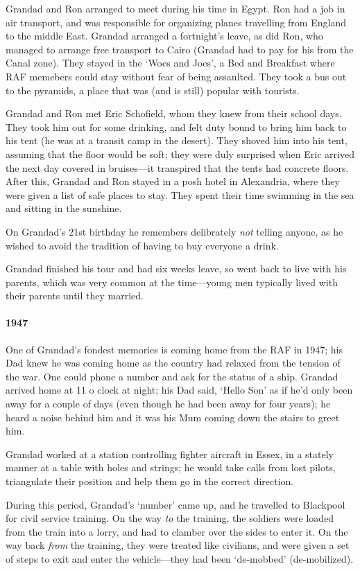 Grandad and Ron arranged to meet during his time in Egypt. Ron had a job
in air transport, and was responsible for organizing planes travelling from England
to the middle East. Grandad arranged a fortnight's leave, as did Ron, who
managed to arrange free transport to Cairo (Grandad had to pay for his from
the Canal zone). They stayed in the `Woes and Joes', a Bed and Breakfast where RAF memebers
could stay without fear of being assaulted. They took a bus out to the pyramids, a place
that was (and is still) popular with tourists.

Grandad and Ron met Eric Schofield, whom they knew from their school days. They
took him out for some drinking, and felt duty bound to bring him back to his tent (he was
at a transit camp in the desert). They shoved him into his tent, assuming that
the floor would be soft; they were duly surprised when Eric arrived the next day
covered in bruises---it transpired that the tents had concrete floors. After this,
Grandad and Ron stayed in a posh hotel in Alexandria, where they were given
a list of safe places to stay. They spent their time swimming in the sea
and sitting in the sunshine.

On Grandad's 21st birthday he remembers delibrately \emph{not} telling anyone, as
he wished to avoid the tradition of having to buy everyone a drink.

Grandad finished his tour and had six weeks leave, so went back to live with his parents, which was
very common at the time---young men typically lived with their parents until they married.

\paragraph{1947} One of Grandad's fondest memories is coming home from the RAF in 1947; his Dad knew
he was coming home  as the country had relaxed from the tension of the war.
One could phone a number and ask for the status of a ship. Grandad arrived home at
11 o clock at night; his Dad said, `Hello Son' as if he'd only been away for
a couple of days (even though he had been away for four years); he heard a noise
behind him and it was his Mum coming down the stairs to greet him.

Grandad worked at a station controlling fighter aircraft in Essex, in a stately manner at a table
with holes and strings; he would take calls from lost pilots, triangulate their position
and help them go in the correct direction.

During this period, Grandad's `number' came up, and he travelled to Blackpool for
civil service training. On the way \emph{to} the training, the soldiers were loaded from
the train into a lorry, and had to clamber over the sides to enter it. On the
way back \emph{from} the training, they were treated like civilians, and were
given a set of steps to exit and enter the vehicle---they had been `de-mobbed' (de-mobilized).

